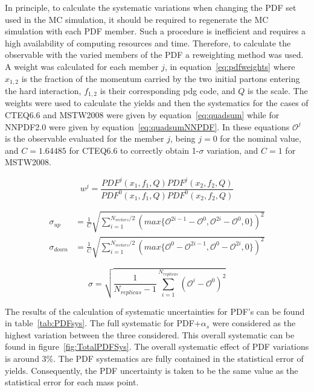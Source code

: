 In principle, to calculate the systematic variations when changing the PDF set used in the MC simulation, it should be required to regenerate the MC simulation with each PDF member. Such a procedure is inefficient and requires a high availability of computing resources and time. Therefore, to calculate the observable with the varied members of the PDF a reweighting method was used. A weight was calculated for each member $j$, in equation~\ref{eq:pdfweights} where $x_{1,2}$ is the fraction of the momentum carried by the two initial partons entering the hard interaction, $f_{1,2}$ is their corresponding pdg code, and $Q$ is the scale. The weights were used to calculate the yields and then the systematics for the cases of CTEQ6.6 and MSTW2008 were given by equation~\ref{eq:quadsum} while for NNPDF2.0 were given by equation~\ref{eq:quadsumNNPDF}. In these equations $\mathcal{O}^{j}$ is the observable evaluated for the member $j$, being $j=0$ for the nominal value, and $C=1.64485$ for CTEQ6.6 to correctly obtain 1-$\sigma$ variation, and $C=1$ for MSTW2008.

\begin{equation} \label{eq:pdfweights}
w^{j}=\frac{PDF^{j}(x_{1},f_{1},Q)PDF^{j}(x_{2},f_{2},Q)}{PDF^{0}(x_{1},f_{1},Q)PDF^{0}(x_{2},f_{2},Q)}
\end{equation}

\begin{align} \label{eq:quadsum}
\sigma_{up} & = \frac{1}{C}\sqrt{\sum_{i=1}^{N_{vectors}/2}(max\{\mathcal{O}^{2i-1}-\mathcal{O}^{0},\mathcal{O}^{2i}-\mathcal{O}^{0},0\})^{2}} \nonumber\\
\sigma_{down} & = \frac{1}{C}\sqrt{\sum_{i=1}^{N_{vectors}/2}(max\{\mathcal{O}^{0}-\mathcal{O}^{2i-1},\mathcal{O}^{0}-\mathcal{O}^{2i},0\})^{2}}
\end{align}

\begin{equation} \label{eq:quadsumNNPDF}
\sigma = \sqrt{\frac{1}{N_{replicas}-1}\sum_{i=1}^{N_{replicas}}(\mathcal{O}^{i}-\mathcal{O}^{0})^{2}} 
\end{equation}

The results of the calculation of systematic uncertainties for PDF's can be found in table~\ref{tab:PDFsys}. The full systematic for PDF+$\alpha_{s}$ were considered as the highest variation between the three considered. This overall systematic can be found in figure~\ref{fig:TotalPDFSys}. The overall systematic effect of PDF variations is around 3\%. The PDF systematics are fully contained in the statistical error of yields. Consequently, the PDF uncertainty is taken to be the same value as the statistical error for each mass point.


